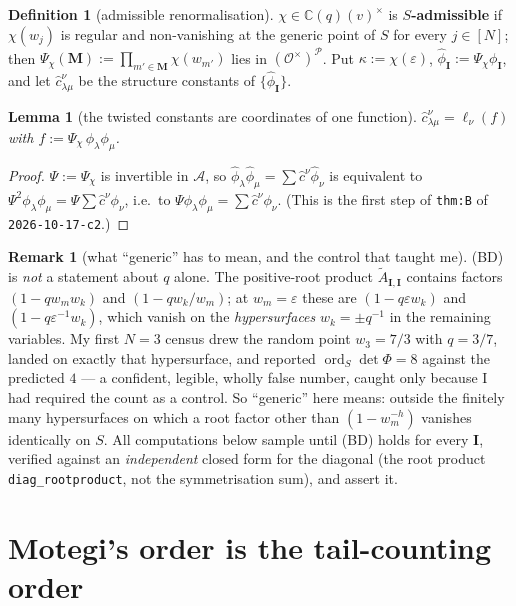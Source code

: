\documentclass[11pt]{article}
\newtheorem{lem}[thm]{Lemma}
\theoremstyle{definition}
\newtheorem{defn}[thm]{Definition}
\newtheorem{rem}[thm]{Remark}
\newcommand{\At}{\widetilde{A}}
\newcommand{\bM}{\mathbf{M}}
\newcommand{\bI}{\mathbf{I}}
\newcommand{\ord}{\operatorname{ord}}
\begin{document}
\begin{defn}[admissible renormalisation]\label{def:adm}
$\chi\in\mathbb{C}(q)(v)^{\times}$ is \textbf{$S$-admissible} if $\chi(w_j)$ is
regular and non-vanishing at the generic point of $S$ for every $j\in[N]$; then
$\Psi_\chi(\bM):=\prod_{m'\in\bM}\chi(w_{m'})$ lies in
$(\mathcal{O}^{\times})^{\mathcal{P}}$.  Put $\kappa:=\chi(\varepsilon)$,
$\hat\phi_{\bI}:=\Psi_\chi\phi_{\bI}$, and let $\hat c^{\nu}_{\lambda\mu}$ be the
structure constants of $\{\hat\phi_{\bI}\}$.
\end{defn}

\begin{lem}[the twisted constants are coordinates of one function]\label{lem:red}
$\hat c^{\nu}_{\lambda\mu}=\ell_\nu(f)$ with $f:=\Psi_\chi\,\phi_\lambda\phi_\mu$.
\end{lem}
\begin{proof}
$\Psi:=\Psi_\chi$ is invertible in $\mathcal{A}$, so
$\hat\phi_\lambda\hat\phi_\mu=\sum\hat c^{\nu}\hat\phi_\nu$ is equivalent to
$\Psi^{2}\phi_\lambda\phi_\mu=\Psi\sum\hat c^{\nu}\phi_\nu$, i.e.\ to
$\Psi\phi_\lambda\phi_\mu=\sum\hat c^{\nu}\phi_\nu$.  (This is the first step of
\texttt{thm:B} of \texttt{2026-10-17-c2}.)
\end{proof}

\begin{rem}[what ``generic'' has to mean, and the control that taught me]
\label{rem:generic}
(BD) is \emph{not} a statement about $q$ alone.  The positive-root product
$\At_{\bI,\bI}$ contains factors $(1-qw_mw_k)$ and $(1-qw_k/w_m)$; at
$w_m=\varepsilon$ these are $(1-q\varepsilon w_k)$ and
$(1-q\varepsilon^{-1}w_k)$, which vanish on the \emph{hypersurfaces}
$w_k=\pm q^{-1}$ in the remaining variables.  My first $N=3$ census drew the
random point $w_3=7/3$ with $q=3/7$, landed on exactly that hypersurface, and
reported $\ord_S\det\Phi=8$ against the predicted $4$ --- a confident, legible,
wholly false number, caught only because I had required the count as a control.
So ``generic'' here means: outside the finitely many hypersurfaces on which a
root factor other than $(1-w_m^{-h})$ vanishes identically on $S$.  All
computations below sample until (BD) holds for every $\bI$, verified against an
\emph{independent} closed form for the diagonal (the root product
\texttt{diag\_rootproduct}, not the symmetrisation sum), and assert it.
\end{rem}

\section{Motegi's order is the tail-counting order}
\label{sec:order}
\end{document}
